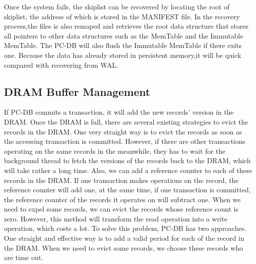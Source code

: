 Once the system fails, 
the skiplist can be recovered  by locating the root of skiplist, 
the address of which is stored in the MANIFEST file. In the recovery process,the files is also remaped and retrieves the root data structure that stores all pointers to other data structures such as the MemTable and the Immutable MemTable. The PC-DB will also flush the Immutable MemTable if there exits one.
Because the data has already stored in persistent memory,it will be quick compared with recovering from WAL.



    
\subsection{DRAM Buffer Management}
If PC-DB commits a transaction, it will add the new records' version in the DRAM. Once the DRAM is full, there are several existing strategies to evict the records in the DRAM. One very straight way is to evict the records as soon as the accessing transaction is committed. 
However, if there are other transactions operating on the same records in the meanwhile, they has to wait for the background thread to fetch the versions of the records back to the DRAM, which will take rather a long time. Also, we can  add a reference counter to each of these records in the DRAM. If one transaction makes operations on the record, the reference counter will add one, at the same time, if one transaction is committed, the reference counter of the records it operates on will subtract one. When we need to expel some records, we can evict the records whose reference count is zero. However, this method will transform the read operation into a write operation, which costs a lot. To solve this problem, PC-DB has two approaches. One straight and effective way is to add a valid period for each of the record in the DRAM. When we need to evict some records, we choose these records who are time out. 

